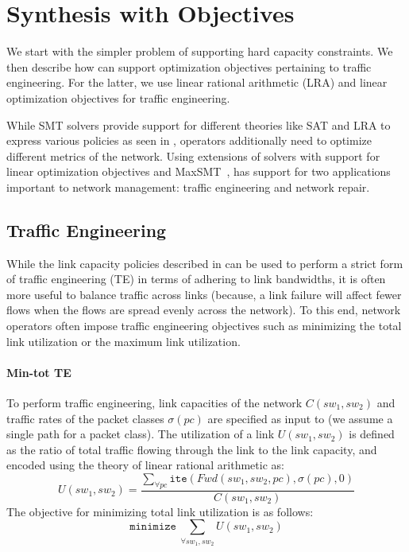 \section{Synthesis with Objectives}
\label{sec:optimization}

We start with the simpler problem of supporting hard capacity
constraints. We then describe how \Name can support optimization
objectives pertaining to traffic engineering. For the latter, we use
linear rational arithmetic (LRA) and linear optimization objectives
for traffic engineering.


While SMT solvers provide support for different theories like SAT and
LRA to express various policies as seen in ,
operators additionally need to optimize different metrics of the
network. Using extensions of solvers with support for linear
optimization objectives and MaxSMT~\cite{maxsmt}, \name has support
for two applications important to network management: traffic
engineering and network repair.

\subsection{Traffic Engineering}
While the link capacity policies described in  can
be used to perform a strict form of traffic engineering (TE) in terms
of adhering to link bandwidths, it is often more useful to balance
traffic across links (because, a link failure will affect fewer flows
when the flows are spread evenly across the network).  To this end,
network operators often impose traffic engineering objectives such as
minimizing the total link utilization or the maximum link utilization.

\paragraph{Min-tot TE}
To perform traffic engineering, link capacities of the network $C(sw_1, sw_2)$ and traffic 
rates of the packet classes $\sigma(pc)$ are specified as input to \name (we assume a single
path for a packet class). The utilization 
of a link $U(sw_1, sw_2)$ is defined as the ratio of total traffic flowing through the link to the 
link capacity, and encoded using the theory of linear rational arithmetic as:
\begin{equation}
U(sw_1, sw_2) = \frac{\sum_{\forall pc} \texttt{ite}(Fwd(sw_1,sw_2, pc), \sigma(pc), 0)} {C(sw_1, sw_2)}
\end{equation}
The objective for minimizing total link utilization is as follows:
\begin{equation}
	\texttt{minimize}\ \sum_{\forall sw_1, sw_2} U(sw_1, sw_2)
\end{equation}
